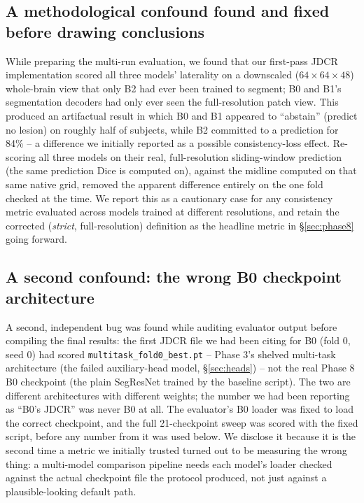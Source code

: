 \documentclass[conference]{IEEEtran}
\begin{document}
\subsection{A methodological confound found and fixed before drawing conclusions}
\label{sec:jdcrconfound}
While preparing the multi-run evaluation, we found that our first-pass JDCR implementation scored all three models' laterality on a downscaled ($64{\times}64{\times}48$) whole-brain view that only B2 had ever been trained to segment; B0 and B1's segmentation decoders had only ever seen the full-resolution patch view. This produced an artifactual result in which B0 and B1 appeared to ``abstain'' (predict no lesion) on roughly half of subjects, while B2 committed to a prediction for 84\% -- a difference we initially reported as a possible consistency-loss effect. Re-scoring all three models on their real, full-resolution sliding-window prediction (the same prediction Dice is computed on), against the midline computed on that same native grid, removed the apparent difference entirely on the one fold checked at the time. We report this as a cautionary case for any consistency metric evaluated across models trained at different resolutions, and retain the corrected (\emph{strict}, full-resolution) definition as the headline metric in \S\ref{sec:phase8} going forward.

\subsection{A second confound: the wrong B0 checkpoint architecture}
\label{sec:wrongckpt}
A second, independent bug was found while auditing evaluator output before compiling the final results: the first JDCR file we had been citing for B0 (fold 0, seed 0) had scored \texttt{multitask\_fold0\_best.pt} -- Phase 3's shelved multi-task architecture (the failed auxiliary-head model, \S\ref{sec:heads}) -- not the real Phase 8 B0 checkpoint (the plain SegResNet trained by the baseline script). The two are different architectures with different weights; the number we had been reporting as ``B0's JDCR'' was never B0 at all. The evaluator's B0 loader was fixed to load the correct checkpoint, and the full 21-checkpoint sweep was scored with the fixed script, before any number from it was used below. We disclose it because it is the second time a metric we initially trusted turned out to be measuring the wrong thing: a multi-model comparison pipeline needs each model's loader checked against the actual checkpoint file the protocol produced, not just against a plausible-looking default path.
\end{document}
